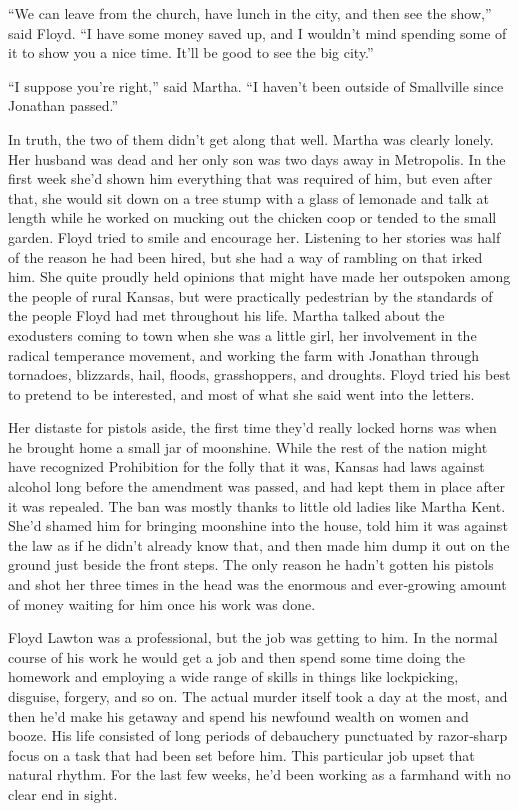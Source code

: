 \documentclass[ebook,12pt]{memoir}
\begin{document}
``We can leave from the church, have lunch in the city, and then see the
show,'' said Floyd. ``I have some money saved up, and I wouldn't mind
spending some of it to show you a nice time. It'll be good to see the
big city.''

``I suppose you're right,'' said Martha. ``I haven't been outside of
Smallville since Jonathan passed.''

In truth, the two of them didn't get along that well. Martha was clearly
lonely. Her husband was dead and her only son was two days away in
Metropolis. In the first week she'd shown him everything that was
required of him, but even after that, she would sit down on a tree stump
with a glass of lemonade and talk at length while he worked on mucking
out the chicken coop or tended to the small garden. Floyd tried to smile
and encourage her. Listening to her stories was half of the reason he
had been hired, but she had a way of rambling on that irked him. She
quite proudly held opinions that might have made her outspoken among the
people of rural Kansas, but were practically pedestrian by the standards
of the people Floyd had met throughout his life. Martha talked about the
exodusters coming to town when she was a little girl, her involvement in
the radical temperance movement, and working the farm with Jonathan
through tornadoes, blizzards, hail, floods, grasshoppers, and droughts.
Floyd tried his best to pretend to be interested, and most of what she
said went into the letters.

Her distaste for pistols aside, the first time they'd really locked
horns was when he brought home a small jar of moonshine. While the rest
of the nation might have recognized Prohibition for the folly that it
was, Kansas had laws against alcohol long before the amendment was
passed, and had kept them in place after it was repealed. The ban was
mostly thanks to little old ladies like Martha Kent. She'd shamed him
for bringing moonshine into the house, told him it was against the law
as if he didn't already know that, and then made him dump it out on the
ground just beside the front steps. The only reason he hadn't gotten his
pistols and shot her three times in the head was the enormous and
ever‐growing amount of money waiting for him once his work was done.

Floyd Lawton was a professional, but the job was getting to him. In the
normal course of his work he would get a job and then spend some time
doing the homework and employing a wide range of skills in things like
lockpicking, disguise, forgery, and so on. The actual murder itself took
a day at the most, and then he'd make his getaway and spend his newfound
wealth on women and booze. His life consisted of long periods of
debauchery punctuated by razor‐sharp focus on a task that had been set
before him. This particular job upset that natural rhythm. For the last
few weeks, he'd been working as a farmhand with no clear end in sight.
\end{document}
